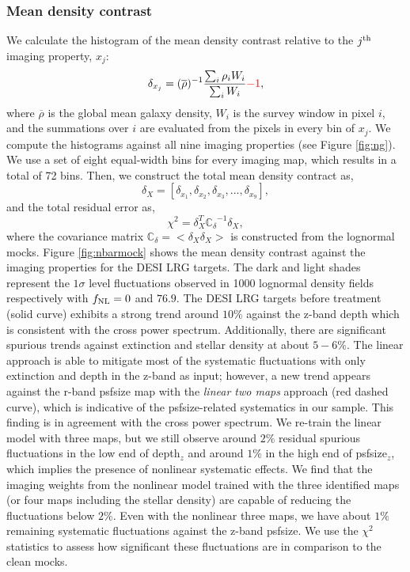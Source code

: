 \subsubsection{Mean density contrast}
We calculate the histogram of the mean density contrast relative to the $j^{\rm th}$ imaging property, $x_{j}$:
\begin{equation}
\delta_{x_{j}} = ({\overline{\rho}})^{-1} \frac{\sum_{i} \rho_{i} W_{i}}{\sum_{i} W_{i}} \textcolor{red}{- 1},
\end{equation}
where $\overline{\rho}$ is the global mean galaxy density, $W_{i}$ is the survey window in pixel $i$, and the summations over $i$ are evaluated from the pixels in every bin of $x_{j}$. We compute the histograms against all nine imaging properties (see Figure \ref{fig:ng}). We use a set of eight equal-width bins for every imaging map, which results in a total of 72 bins. Then, we construct the total mean density contract as,
\begin{equation}
\delta_{X} = [\delta_{x_{1}}, \delta_{x_{2}}, \delta_{x_{3}}, ..., \delta_{x_{9}}],
\end{equation}
and the total residual error as,
\begin{equation}
\chi^{2} = \delta_{X}^{T} \mathbb{C_{\delta}}^{-1} \delta_{X},
\end{equation}
where the covariance matrix $\mathbb{C}_{\delta} = < \delta_{X} \delta_{X}>$ is constructed from the lognormal mocks. Figure \ref{fig:nbarmock} shows the mean density contrast against the imaging properties for the DESI LRG targets. The dark and light shades represent the $1\sigma$ level fluctuations observed in 1000 lognormal density fields respectively with $f_{\rm NL}=0$ and $76.9$. The DESI LRG targets before treatment (solid curve) exhibits a strong trend around $10\%$ against the z-band depth which is consistent with the cross power spectrum. Additionally, there are significant spurious trends against extinction and stellar density at about $5-6\%$. The linear approach is able to mitigate most of the systematic fluctuations with only extinction and depth in the z-band as input; however, a new trend appears against the r-band psfsize map with the \textit{linear two maps} approach (red dashed curve), which is indicative of the psfsize-related systematics in our sample. This finding is in agreement with the cross power spectrum. We re-train the linear model with three maps, but we still observe around $2\%$ residual spurious fluctuations in the low end of depth$_{z}$ and around $1\%$ in the high end of psfsize$_{z}$, which implies the presence of nonlinear systematic effects. We find that the imaging weights from the nonlinear model trained with the three identified maps (or four maps including the stellar density) are capable of reducing the fluctuations below $2\%$. Even with the nonlinear three maps, we have about $1\%$ remaining systematic fluctuations against the z-band psfsize. We use the $\chi^{2}$ statistics to assess how significant these fluctuations are in comparison to the clean mocks. 

